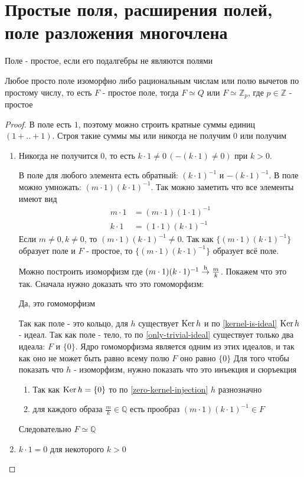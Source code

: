 \documentclass[../main/document.tex]{subfiles}
\begin{document}
\section{Простые поля, расширения полей, поле разложения многочлена}
\begin{dfn}
Поле - простое, если его подалгебры не являются полями
\end{dfn}
\begin{dfn}
\end{dfn}
\begin{thm}
Любое просто поле изоморфно либо рациональным числам или полю вычетов по простому числу, то есть
$F$ - простое поле, тогда $F\simeq Q$ или $F\simeq \mathbb{Z}_p$, где $p\in\mathbb{Z}$ - простое
\begin{proof}
В поле есть $1$, поэтому можно строить кратные суммы единиц $(1+..+1)$. Строя такие суммы  мы или никогда не получим $0$ или получим
\begin{enumerate}
\item Никогда не получится $0$, то есть $k\cdot 1\neq 0\,(-(k\cdot 1)\neq 0)$ при $k>0$.

В поле для любого элемента есть обратный: $(k\cdot 1)^{-1}$ и $-(k\cdot 1)^{-1}$. В поле можно умножать: $(m\cdot 1)(k\cdot 1)^{-1}$. Так можно заметить что все элементы имеют вид
\begin{align*}
m\cdot 1&=(m\cdot 1)(1\cdot 1)^{-1}\\
k\cdot 1&=(1\cdot 1)(k\cdot 1)^{-1}
\end{align*}
Если $m\neq 0,k\neq 0$, то $(m\cdot 1)(k\cdot 1)^{-1}\neq 0$.
Так как $\{(m\cdot 1)(k\cdot 1)^{-1}\}$ образует поле и $F$ - простое, то $\{(m\cdot 1)(k\cdot 1)^{-1}\}$ образует всё поле.

Можно построить изоморфизм где $(m\cdot 1)(k\cdot 1)^{-1}\stackrel{\text{h}}{\rightarrow}\frac{m}{k}$. Покажем что это так. Сначала нужно доказать что это гомоморфизм:

Да, это гомоморфизм

Так как поле - это кольцо, для $h$ существует $\operatorname{Ker} h$ и по \ref{kernel-is-ideal} $\operatorname{Ker} h$ - идеал. Так как поле - тело, то по \ref{only-trivial-ideal} существует только два идеала: $F$ и $\{0\}$. Ядро гомоморфизма является одним из этих идеалов, и так как оно не может быть равно всему полю $F$ оно равно $\{0\}$
Для того чтобы показать что $h$ - изоморфизм, нужно показать что это инъекция и сюръекция
\begin{enumerate}
\item Так как $\operatorname{Ker} h=\{0\}$ то по \ref{zero-kernel-injection} $h$ разнозначно
\item для каждого образа $\frac{m}{k}\in \mathbb{Q}$ есть прообраз $(m\cdot 1)(k\cdot 1)^{-1}\in F$
\end{enumerate}
Следовательно $F\simeq \mathbb{Q}$
\item $k\cdot 1=0$ для некоторого $k>0$


\end{enumerate}
\end{proof}
\end{thm}
\end{document}
